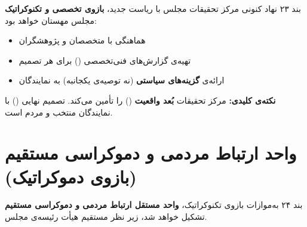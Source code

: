 \documentclass[12pt,a4paper,twoside,openany]{book}
\begin{document}
	\begin{bandbox}{بند ۲۳}
		نهاد کنونی مرکز تحقیقات مجلس با ریاست جدید، \textbf{بازوی تخصصی و تکنوکراتیک}
		مجلس مهستان خواهد بود:
		\begin{itemize}
			\item هماهنگی با متخصصان و پژوهشگران
			\item تهیه‌ی گزارش‌های فنی‌تخصصی () برای هر تصمیم
			\item ارائه‌ی \textbf{گزینه‌های سیاستی} (نه توصیه‌ی یکجانبه) به نمایندگان
		\end{itemize}
		\begin{quotebox}
			\textbf{نکته‌ی کلیدی:} مرکز تحقیقات \textbf{بُعد واقعیت} () را تأمین
			می‌کند. تصمیم نهایی () با نمایندگان منتخب و مردم است.
		\end{quotebox}
	\end{bandbox}
	
	\section{واحد ارتباط مردمی و دموکراسی مستقیم (بازوی دموکراتیک)}
	
	\begin{bandbox}{بند ۲۴}
		به‌موازات بازوی تکنوکراتیک، \textbf{واحد مستقل ارتباط مردمی و دموکراسی مستقیم}
		تشکیل خواهد شد، زیر نظر مستقیم هیأت رئیسه‌ی مجلس.
	\end{bandbox}
	
\end{document}

